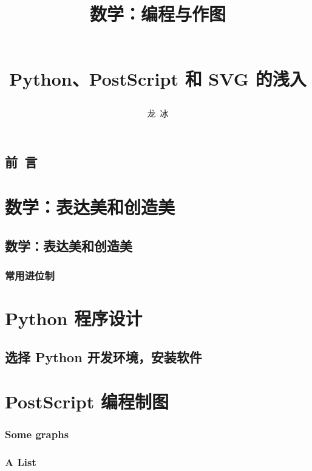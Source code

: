 \documentclass[zihao=-4,heading=true,a4paper,twoside,openany]{ctexbook}
\title{\begin{kaishu}数学：编程与作图\end{kaishu}\\
	Python、PostScript 和 SVG 的浅入}
\author{\kaishu 龙\,  冰}
\date{}
\begin{document}
\begin{titlepage}
	\maketitle
\end{titlepage}
\chapter*{\kaishu 前\, 言}%


\tableofcontents

\part{数学：表达美和创造美}
\chapter{数学：表达美和创造美}%




\section{常用进位制}\label{sec:II.2}


\part{Python 程序设计}
\chapter{选择 Python 开发环境，安装软件}\label{sec:II.2}




\newpage\part{PostScript 编程制图}
\section{Some graphs}


\section{A List}


\printindex
\printbibliography
\end{document}
